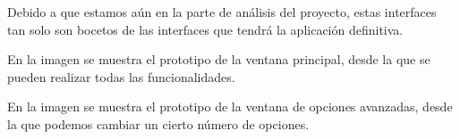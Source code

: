 Debido a que estamos aún en la parte de análisis del proyecto, estas interfaces tan solo son bocetos de las interfaces que tendrá la aplicación definitiva.

En la imagen  se muestra el prototipo de la ventana principal, desde la que se pueden realizar todas las funcionalidades.


En la imagen  se muestra el prototipo de la ventana de opciones avanzadas, desde la que podemos cambiar un cierto número de opciones.

